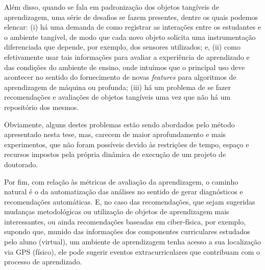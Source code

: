 Além disso, quando se fala em padronização dos objetos tangíveis de aprendizagem, uma série de desafios se fazem presentes, dentre os quais podemos elencar: (i) há uma demanda de como registrar as interações entre os estudantes e o ambiente tangível, de modo que cada novo objeto solicita uma instrumentação diferenciada que depende, por exemplo, dos sensores utilizados; e, (ii) como efetivamente usar tais informações para avaliar a experiência de aprendizado e das condições do ambiente de ensino, onde intuímos que o principal uso deve acontecer no sentido do fornecimento de novas \textit{features} para algoritmos de aprendizagem de máquina ou profunda; (iii) há um problema de se fazer recomendações e avaliações de objetos tangíveis uma vez que não há um repositório dos mesmos.

Obviamente, alguns destes problemas estão sendo abordados pelo método apresentado nesta tese, mas, carecem de maior aprofundamento e mais experimentos, que não foram possíveis devido às restrições de tempo, espaço e recursos impostos pela própria dinâmica de execução de um projeto de doutorado. 

Por fim, com relação às métricas de avaliação da aprendizagem, o caminho natural é o da automatização das análises no sentido de gerar diagnósticos e recomendações automáticas. E, no caso das recomendações, que sejam sugeridas mudanças metodológicas ou utilização de objetos de aprendizagem mais interessantes, ou ainda recomendações baseadas em ciber-física, por exemplo, supondo que, munido das informações dos componentes curriculares estudados pelo aluno (virtual), um ambiente de aprendizagem tenha acesso a sua localização via GPS (físico), ele pode sugerir eventos extracurriculares que contribuam com o processo de aprendizado.